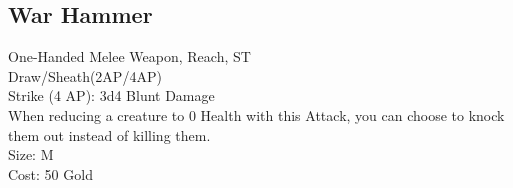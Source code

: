 \subsection{War Hammer}\label{weapon:warHammer}
One-Handed Melee Weapon,  Reach, ST\\
Draw/Sheath(2AP/4AP)\\
Strike (4 AP): 3d4 Blunt Damage\\
When reducing a creature to 0 Health with this Attack, you can choose to knock them out instead of killing them.\\
Size: M\\
Cost: 50 Gold\\